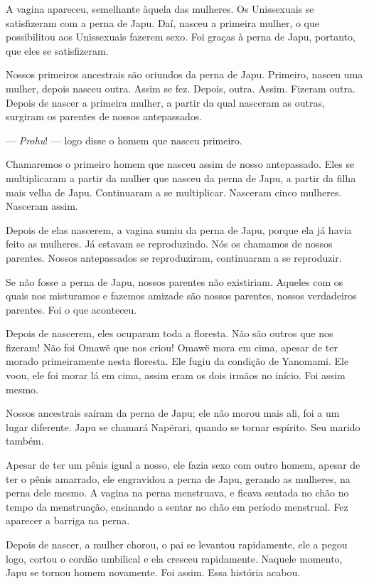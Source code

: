 A vagina apareceu, semelhante àquela das mulheres. Os Unissexuais se
satisfizeram com a perna de Japu. Daí, nasceu a primeira mulher, o que
possibilitou aos Unissexuais fazerem sexo. Foi graças à perna de Japu, portanto,
que eles se satisfizeram. 

Nossos primeiros ancestrais são oriundos da perna de Japu. Primeiro,
nasceu uma mulher, depois nasceu outra. Assim se fez. Depois, outra.
Assim. Fizeram outra. Depois de nascer a primeira mulher, a partir da
qual nasceram as outras, surgiram os parentes de nossos antepassados. 

--- \textit{Prohu}! --- logo disse o homem que nasceu primeiro. 

Chamaremos o primeiro homem que nasceu assim de nosso antepassado.
Eles se multiplicaram a partir da mulher que nasceu da perna de Japu, a
partir da filha mais velha de Japu. Continuaram a se multiplicar.
Nasceram cinco mulheres. Nasceram assim. 

Depois de elas nascerem, a vagina sumiu da perna de Japu, porque ela já
havia feito as mulheres. Já estavam se reproduzindo. Nós os chamamos de
nossos parentes. Nossos antepassados se reproduziram, continuaram a se
reproduzir. 

Se não fosse a perna de Japu, nossos parentes não existiriam. Aqueles
com os quais nos misturamos e fazemos amizade são nossos parentes,
nossos verdadeiros parentes. Foi o que aconteceu.

Depois de nascerem, eles ocuparam toda a floresta. Não são outros que
nos fizeram! Não foi Omawë que nos criou! Omawë mora em cima, apesar de
ter morado primeiramente nesta floresta. Ele fugiu da condição de
Yanomami. Ele voou, ele foi morar lá em cima, assim eram os dois irmãos
no início. Foi assim mesmo. 

Nossos ancestrais saíram da perna de Japu; ele não morou mais ali, foi a
um lugar diferente. Japu se chamará Napërari, quando se tornar
espírito. Seu marido também.

Apesar de ter um pênis igual a nosso, ele fazia sexo com outro homem,
apesar de ter o pênis amarrado, ele engravidou a perna de Japu, gerando
as mulheres, na perna dele mesmo. A vagina na perna menstruava, e ficava
sentada no chão no tempo da menstruação, ensinando a sentar no chão em
período menstrual. Fez aparecer a barriga na perna. 

Depois de nascer, a mulher chorou, o pai se levantou rapidamente, ele a
pegou logo, cortou o cordão umbilical e ela cresceu rapidamente. Naquele
momento, Japu se tornou homem novamente. Foi assim. Essa história
acabou.

